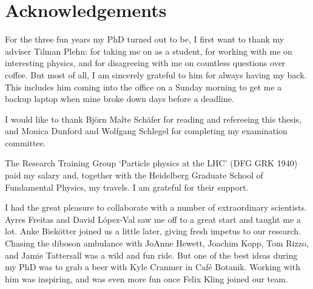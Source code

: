 
\chapter*{Acknowledgements}




For the three fun years my PhD turned out to be, I first want to
thank my adviser Tilman Plehn: for taking me on as a student, for
working with me on interesting physics, and for disagreeing with me on
countless questions over coffee. But most of all, I am sincerely
grateful to him for always having my back. This includes him coming
into the office on a Sunday morning to get me a backup laptop when
mine broke down days before a deadline.
%
%
%

I would like to thank Bj\"orn Malte Sch\"afer for reading and
refereeing this thesis, and Monica Dunford and Wolfgang Schlegel for
completing my examination committee.
%

The Research Training Group `Particle physics at the LHC' (DFG GRK
1940) paid my salary and, together with the Heidelberg Graduate School
of Fundamental Physics, my travels. I am grateful for their support.

I had the great pleasure to collaborate with a number of extraordinary
scientists. Ayres Freitas and David L\'opez-Val saw me off to a great
start and taught me a lot. Anke Biek\"otter joined us a little later,
giving fresh impetus to our research. Chasing the diboson ambulance
with JoAnne Hewett, Joachim Kopp, Tom Rizzo, and Jamie Tattersall was
a wild and fun ride. But one of the best ideas during my PhD was to
grab a beer with Kyle Cranmer in Caf\'e Botanik. Working with him was
inspiring, and was even more fun once Felix Kling joined our team.

